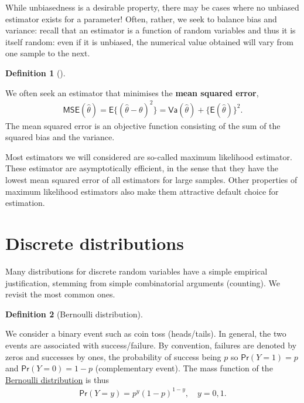 \documentclass[
  11pt,
  letterpaper,
]{scrbook}
\theoremstyle{plain}
\theoremstyle{definition}
\theoremstyle{definition}
\newtheorem{definition}{Definition}[chapter]
\theoremstyle{plain}
\theoremstyle{remark}
\begin{document}
While unbiasedness is a desirable property, there may be cases where no
unbiased estimator exists for a parameter! Often, rather, we seek to
balance bias and variance: recall that an estimator is a function of
random variables and thus it is itself random: even if it is unbiased,
the numerical value obtained will vary from one sample to the next.

\begin{definition}[]\protect\hypertarget{def-mse}{}\label{def-mse}

We often seek an estimator that minimises the \textbf{mean squared
error}, \begin{align*}
\mathsf{MSE}(\hat{\theta}) = \mathsf{E}\{(\hat{\theta}-\theta)^2\}=\mathsf{Va}(\hat{\theta}) + \{\mathsf{E}(\hat{\theta})\}^2.
\end{align*} The mean squared error is an objective function consisting
of the sum of the squared bias and the variance.

\end{definition}

Most estimators we will considered are so-called maximum likelihood
estimator. These estimator are asymptotically efficient, in the sense
that they have the lowest mean squared error of all estimators for large
samples. Other properties of maximum likelihood estimators also make
them attractive default choice for estimation.

\section{Discrete distributions}\label{discrete-distributions}

Many distributions for discrete random variables have a simple empirical
justification, stemming from simple combinatorial arguments (counting).
We revisit the most common ones.

\begin{definition}[Bernoulli
distribution]\protect\hypertarget{def-bernoullidist}{}\label{def-bernoullidist}

We consider a binary event such as coin toss (heads/tails). In general,
the two events are associated with success/failure. By convention,
failures are denoted by zeros and successes by ones, the probability of
success being \(p\) so \(\mathsf{Pr}(Y=1)=p\) and
\(\mathsf{Pr}(Y=0)=1-p\) (complementary event). The mass function of the
\href{https://en.wikipedia.org/wiki/Bernoulli_distribution}{Bernoulli
distribution} is thus \begin{align*}
\mathsf{Pr}(Y=y) = p^y (1-p)^{1-y}, \quad y=0, 1.
\end{align*}

\end{definition}
\end{document}
